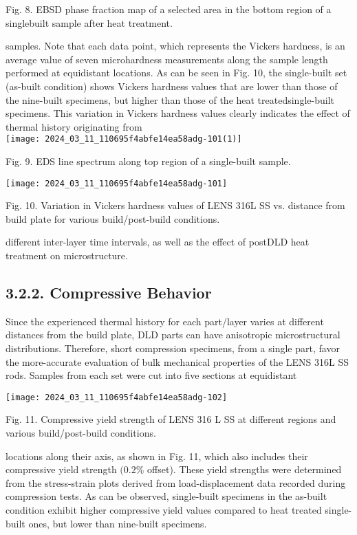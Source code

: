 \documentclass[10pt]{article}
\begin{document}
Fig. 8. EBSD phase fraction map of a selected area in the bottom region of a singlebuilt sample after heat treatment.

samples. Note that each data point, which represents the Vickers hardness, is an average value of seven microhardness measurements along the sample length performed at equidistant locations. As can be seen in Fig. 10, the single-built set (as-built condition) shows Vickers hardness values that are lower than those of the nine-built specimens, but higher than those of the heat treatedsingle-built specimens. This variation in Vickers hardness values clearly indicates the effect of thermal history originating from\\
\texttt{[image: 2024\_03\_11\_110695f4abfe14ea58adg-101(1)]}

Fig. 9. EDS line spectrum along top region of a single-built sample.

\begin{center}
\texttt{[image: 2024\_03\_11\_110695f4abfe14ea58adg-101]}
\end{center}

Fig. 10. Variation in Vickers hardness values of LENS 316L SS vs. distance from build plate for various build/post-build conditions.

different inter-layer time intervals, as well as the effect of postDLD heat treatment on microstructure.

\subsection*{3.2.2. Compressive Behavior}
Since the experienced thermal history for each part/layer varies at different distances from the build plate, DLD parts can have anisotropic microstructural distributions. Therefore, short compression specimens, from a single part, favor the more-accurate evaluation of bulk mechanical properties of the LENS 316L SS rods. Samples from each set were cut into five sections at equidistant

\begin{center}
\texttt{[image: 2024\_03\_11\_110695f4abfe14ea58adg-102]}
\end{center}

Fig. 11. Compressive yield strength of LENS 316 L SS at different regions and various build/post-build conditions.

locations along their axis, as shown in Fig. 11, which also includes their compressive yield strength $(0.2 \%$ offset). These yield strengths were determined from the stress-strain plots derived from load-displacement data recorded during compression tests. As can be observed, single-built specimens in the as-built condition exhibit higher compressive yield values compared to heat treated single-built ones, but lower than nine-built specimens.
\end{document}
